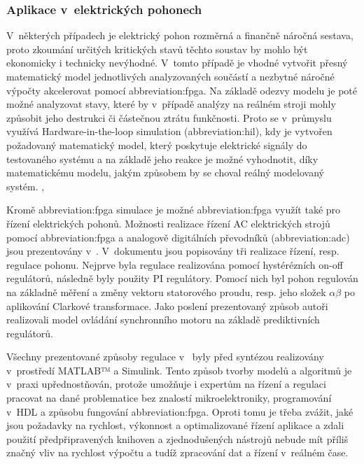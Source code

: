 \documentclass[a4paper, twoside, 11pt]{article}
\begin{document}
			\subsubsection{Aplikace v~elektrických pohonech}
			V~některých případech je elektrický pohon rozměrná a finančně náročná sestava, proto zkoumání určitých kritických stavů těchto soustav by mohlo být ekonomicky i technicky nevýhodné. V~tomto případě je vhodné vytvořit přesný matematický model jednotlivých analyzovaných součástí a nezbytné náročné výpočty akcelerovat pomocí \gls{abbreviation:fpga}. Na základě odezvy modelu je poté možné analyzovat stavy, které by v~případě analýzy na reálném stroji mohly způsobit jeho destrukci či částečnou ztrátu funkčnosti. Proto se v~průmyslu využívá Hardware-in-the-loop simulation (\gls{abbreviation:hil}), kdy je vytvořen požadovaný matematický model, který poskytuje elektrické signály do testovaného systému a na základě jeho reakce je možné vyhodnotit, díky matematickému modelu, jakým způsobem by se choval reálný modelovaný systém. \cite{andina-advanced-features-and-industrial-applications-of-fpga}, \cite{mathworks-discovery-hil-simulation}\par
			Kromě \gls{abbreviation:fpga} simulace je možné \gls{abbreviation:fpga} využít také pro řízení elektrických pohonů. Možnosti realizace řízení AC elektrických strojů pomocí \gls{abbreviation:fpga} a analogově digitálních převodníků (\gls{abbreviation:adc}) jsou prezentovány v~\cite{naouar-fpga-based-current-controllers-for-ac-machine-drives}. V~dokumentu jsou popisovány tři realizace řízení, resp. regulace pohonu. Nejprve byla regulace realizována pomocí hystérézních on-off regulátorů, následně byly použity PI regulátory. Pomocí nich byl pohon regulován na základně měření a změny vektoru statorového proudu, resp. jeho složek $\alpha \beta$ po aplikování Clarkové transformace. Jako poslení prezentovaný způsob autoři realizovali model ovládání synchronního motoru na základě prediktivních regulátorů. \cite{naouar-fpga-based-current-controllers-for-ac-machine-drives}\par Všechny prezentované způsoby regulace v~\cite{naouar-fpga-based-current-controllers-for-ac-machine-drives} byly před syntézou realizovány v~prostředí MATLAB™️ a Simulink. Tento způsob tvorby modelů a algoritmů je v~praxi upřednostňován, protože umožňuje i expertům na řízení a regulaci pracovat na dané problematice bez znalostí mikroelektroniky, programování v~HDL a způsobu fungování \gls{abbreviation:fpga}. Oproti tomu je třeba zvážit, jaké jsou požadavky na rychlost, výkonnost a optimalizované řízení aplikace a zdali použití předpřipravených knihoven a zjednodušených nástrojů nebude mít příliš značný vliv na rychlost výpočtu a tudíž zpracování dat a řízení v~reálném čase.~\cite{naouar-fpga-based-current-controllers-for-ac-machine-drives}
			
\end{document}
